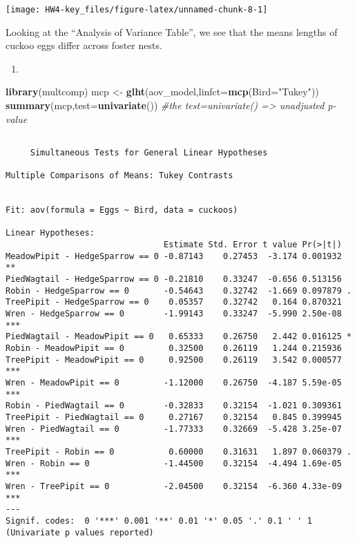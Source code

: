 \documentclass[]{article}
\newenvironment{Shaded}{\begin{snugshade}}{\end{snugshade}}
\newcommand{\KeywordTok}[1]{\textcolor[rgb]{0.13,0.29,0.53}{\textbf{#1}}}
\newcommand{\DataTypeTok}[1]{\textcolor[rgb]{0.13,0.29,0.53}{#1}}
\newcommand{\StringTok}[1]{\textcolor[rgb]{0.31,0.60,0.02}{#1}}
\newcommand{\CommentTok}[1]{\textcolor[rgb]{0.56,0.35,0.01}{\textit{#1}}}
\newcommand{\NormalTok}[1]{#1}
\begin{document}
\texttt{[image: HW4-key\_files/figure-latex/unnamed-chunk-8-1]}

Looking at the ``Analysis of Variance Table'', we see that the means
lengths of cuckoo eggs differ across foster nests.

\begin{enumerate}
\def\labelenumi{\alph{enumi}.}
\setcounter{enumi}{2}
\item
\end{enumerate}

\begin{Shaded}
\begin{Highlighting}[]
\KeywordTok{library}\NormalTok{(multcomp)}
\NormalTok{mcp <-}\StringTok{ }\KeywordTok{glht}\NormalTok{(aov_model,}\DataTypeTok{linfct=}\KeywordTok{mcp}\NormalTok{(}\DataTypeTok{Bird=}\StringTok{"Tukey"}\NormalTok{))}
\KeywordTok{summary}\NormalTok{(mcp,}\DataTypeTok{test=}\KeywordTok{univariate}\NormalTok{()) }\CommentTok{#the test=univariate() => unadjusted p-value}
\end{Highlighting}
\end{Shaded}

\begin{verbatim}

     Simultaneous Tests for General Linear Hypotheses

Multiple Comparisons of Means: Tukey Contrasts


Fit: aov(formula = Eggs ~ Bird, data = cuckoos)

Linear Hypotheses:
                                Estimate Std. Error t value Pr(>|t|)    
MeadowPipit - HedgeSparrow == 0 -0.87143    0.27453  -3.174 0.001932 ** 
PiedWagtail - HedgeSparrow == 0 -0.21810    0.33247  -0.656 0.513156    
Robin - HedgeSparrow == 0       -0.54643    0.32742  -1.669 0.097879 .  
TreePipit - HedgeSparrow == 0    0.05357    0.32742   0.164 0.870321    
Wren - HedgeSparrow == 0        -1.99143    0.33247  -5.990 2.50e-08 ***
PiedWagtail - MeadowPipit == 0   0.65333    0.26750   2.442 0.016125 *  
Robin - MeadowPipit == 0         0.32500    0.26119   1.244 0.215936    
TreePipit - MeadowPipit == 0     0.92500    0.26119   3.542 0.000577 ***
Wren - MeadowPipit == 0         -1.12000    0.26750  -4.187 5.59e-05 ***
Robin - PiedWagtail == 0        -0.32833    0.32154  -1.021 0.309361    
TreePipit - PiedWagtail == 0     0.27167    0.32154   0.845 0.399945    
Wren - PiedWagtail == 0         -1.77333    0.32669  -5.428 3.25e-07 ***
TreePipit - Robin == 0           0.60000    0.31631   1.897 0.060379 .  
Wren - Robin == 0               -1.44500    0.32154  -4.494 1.69e-05 ***
Wren - TreePipit == 0           -2.04500    0.32154  -6.360 4.33e-09 ***
---
Signif. codes:  0 '***' 0.001 '**' 0.01 '*' 0.05 '.' 0.1 ' ' 1
(Univariate p values reported)
\end{verbatim}
\end{document}
